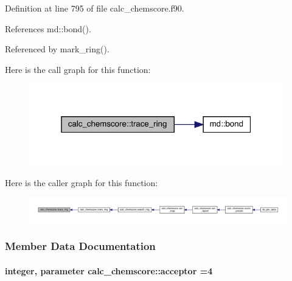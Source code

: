Definition at line 795 of file calc\-\_\-chemscore.\-f90.



References md\-::bond().



Referenced by mark\-\_\-ring().



Here is the call graph for this function\-:
\nopagebreak
\begin{figure}[H]
\begin{center}
\leavevmode
\includegraphics[width=313pt]{classcalc__chemscore_abfb55febeb0d91f6e19fc431c096e3d8_cgraph}
\end{center}
\end{figure}




Here is the caller graph for this function\-:
\nopagebreak
\begin{figure}[H]
\begin{center}
\leavevmode
\includegraphics[width=350pt]{classcalc__chemscore_abfb55febeb0d91f6e19fc431c096e3d8_icgraph}
\end{center}
\end{figure}




\subsubsection{Member Data Documentation}
\hypertarget{classcalc__chemscore_ab0714dffb0d2349340f52b46a349c063}{
\paragraph[{acceptor}]{\setlength{\rightskip}{0pt plus 5cm}integer, parameter calc\-\_\-chemscore\-::acceptor =4}}\label{classcalc__chemscore_ab0714dffb0d2349340f52b46a349c063}


